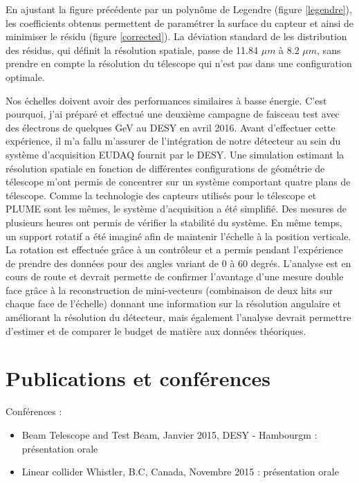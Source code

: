 \documentclass[a4papper, 10pt]{article}
\begin{document}
  En ajustant la figure précédente par un polynôme de Legendre (figure \ref{legendre}), les coefficients obtenus permettent de paramétrer la surface du capteur et ainsi de minimiser le résidu (figure \ref{corrected}). 
  La déviation standard de les distribution des résidus, qui définit la résolution spatiale, passe de 11.84 $\mu m$ à 8.2 $\mu m$, sans prendre en compte la résolution du télescope qui n'est pas dans une configuration optimale.

  Nos échelles doivent avoir des performances similaires à basse énergie.
  C'est pourquoi, j'ai préparé et effectué une deuxième campagne de faisceau test avec des électrons de quelques GeV au DESY en avril 2016.
  Avant d'effectuer cette expérience, il m'a fallu m'assurer de l'intégration de notre détecteur au sein du système d'acquisition EUDAQ fournit par le DESY. 
  Une simulation estimant la résolution spatiale en fonction de différentes configurations de géométrie de télescope m'ont permis de concentrer sur un système comportant quatre plans de télescope.
  Comme la technologie des capteurs utilisés pour le télescope et PLUME sont les mêmes, le système d'acquisition a été simplifié. 
  Des mesures de plusieurs heures ont permis de vérifier la stabilité du système. 
  En même temps, un support rotatif a été imaginé afin de maintenir l'échelle à la position verticale.
  La rotation est effectuée grâce à un contrôleur et a permis pendant l'expérience de prendre des données pour des angles variant de 0 à 60 degrés. 
  L'analyse est en cours de route et devrait permette de confirmer l'avantage d'une mesure double face grâce à la reconstruction de mini-vecteurs (combinaison de deux hits sur chaque face de l'échelle) donnant une information sur la résolution angulaire et améliorant la résolution du détecteur, mais également l'analyse devrait permettre d'estimer et de comparer le budget de matière aux données théoriques.
   

  \section{Publications et conférences}

  Conférences :
  \begin{itemize}
    \item Beam Telescope and Test Beam, Janvier 2015, DESY - Hambourgm : présentation orale
    \item Linear collider Whistler, B.C, Canada, Novembre 2015 : présentation orale 

  \end{itemize}
\end{document}
